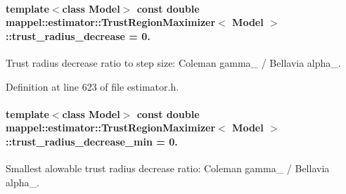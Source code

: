\paragraph[{\texorpdfstring{trust\+\_\+radius\+\_\+decrease}{trust_radius_decrease}}]{\setlength{\rightskip}{0pt plus 5cm}template$<$class Model$>$ const double {\bf mappel\+::estimator\+::\+Trust\+Region\+Maximizer}$<$ Model $>$\+::trust\+\_\+radius\+\_\+decrease = 0.\hspace{0.3cm}{\ttfamily [static]}}\hypertarget{classmappel_1_1estimator_1_1TrustRegionMaximizer_aa96d97d1e10a98270d7de5bbb7131c33}{}\label{classmappel_1_1estimator_1_1TrustRegionMaximizer_aa96d97d1e10a98270d7de5bbb7131c33}


Trust radius decrease ratio to step size\+: Coleman gamma\+\_ / Bellavia alpha\+\_. 



Definition at line 623 of file estimator.\+h.

\paragraph[{\texorpdfstring{trust\+\_\+radius\+\_\+decrease\+\_\+min}{trust_radius_decrease_min}}]{\setlength{\rightskip}{0pt plus 5cm}template$<$class Model$>$ const double {\bf mappel\+::estimator\+::\+Trust\+Region\+Maximizer}$<$ Model $>$\+::trust\+\_\+radius\+\_\+decrease\+\_\+min = 0.\hspace{0.3cm}{\ttfamily [static]}}\hypertarget{classmappel_1_1estimator_1_1TrustRegionMaximizer_a0b90cfb34a88617378caa32312f0ad3b}{}\label{classmappel_1_1estimator_1_1TrustRegionMaximizer_a0b90cfb34a88617378caa32312f0ad3b}


Smallest alowable trust radius decrease ratio\+: Coleman gamma\+\_ / Bellavia alpha\+\_. 



